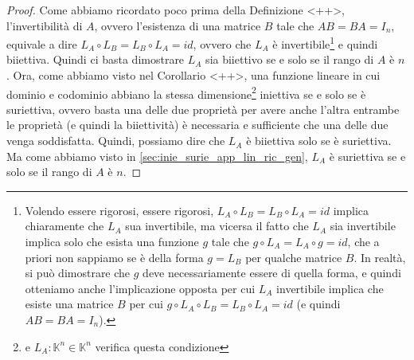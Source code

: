 \begin{proof}
  Come abbiamo ricordato poco prima della Definizione <++>, l'invertibilità di $A$, ovvero l'esistenza di una
  matrice $B$ tale che $AB=BA=I_n$, equivale a dire $L_A\circ L_B=L_B\circ L_A=id$, ovvero che $L_A$ è
  invertibile\footnote{Volendo essere rigorosi, essere rigorosi, $L_A\circ L_B=L_B\circ L_A=id$ implica
    chiaramente che $L_A$ sua invertibile, ma vicersa il fatto che $L_A$ sia invertibile implica solo che esista
    una funzione $g$ tale che $g\circ L_A=L_A\circ g =id$, che a priori non sappiamo se è della forma $g=L_B$ per
    qualche matrice $B$. In realtà, si può dimostrare che $g$ deve necessariamente essere di quella forma, e
    quindi otteniamo anche l'implicazione opposta per cui $L_A$ invertibile implica che esiste una matrice $B$
    per cui $g\circ L_A\circ L_B=L_B\circ L_A =id$ (e quindi $AB=BA=I_n$).} e quindi biiettiva. Quindi ci basta
  dimostrare $L_A$ sia biiettivo se e solo se il rango di $A$ è $n$. Ora, come abbiamo visto nel Corollario <++>,
  una funzione lineare in cui dominio e codominio abbiano la stessa dimensione\footnote{e $L_A: \mathbb{K}^n\in
    \mathbb{K}^n$ verifica questa condizione} iniettiva se e solo se è suriettiva, ovvero basta una delle due
  proprietà per avere anche l'altra entrambe le proprietà (e quindi la biiettività) è necessaria e sufficiente
  che una delle due venga soddisfatta. Quindi, possiamo dire che $L_A$ è biiettiva solo se è suriettiva.
  Ma come abbiamo visto in \ref{sec:inie_surie_app_lin_ric_gen}, $L_A$ è suriettiva se e solo se il rango
  di $A$ è $n$. 
\end{proof}
